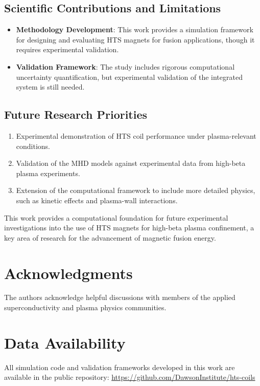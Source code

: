\documentclass[12pt,a4paper]{article}
\begin{document}
\subsection{Scientific Contributions and Limitations}
\begin{itemize}
\item \textbf{Methodology Development}: This work provides a simulation framework for designing and evaluating HTS magnets for fusion applications, though it requires experimental validation.
\item \textbf{Validation Framework}: The study includes rigorous computational uncertainty quantification, but experimental validation of the integrated system is still needed.
\end{itemize}

\subsection{Future Research Priorities}
\begin{enumerate}
\item Experimental demonstration of HTS coil performance under plasma-relevant conditions.
\item Validation of the MHD models against experimental data from high-beta plasma experiments.
\item Extension of the computational framework to include more detailed physics, such as kinetic effects and plasma-wall interactions.
\end{enumerate}

This work provides a computational foundation for future experimental investigations into the use of HTS magnets for high-beta plasma confinement, a key area of research for the advancement of magnetic fusion energy.

\section*{Acknowledgments}

The authors acknowledge helpful discussions with members of the applied superconductivity and plasma physics communities.



\section*{Data Availability}

All simulation code and validation frameworks developed in this work are available in the public repository: \url{https://github.com/DawsonInstitute/hts-coils}
\end{document}
